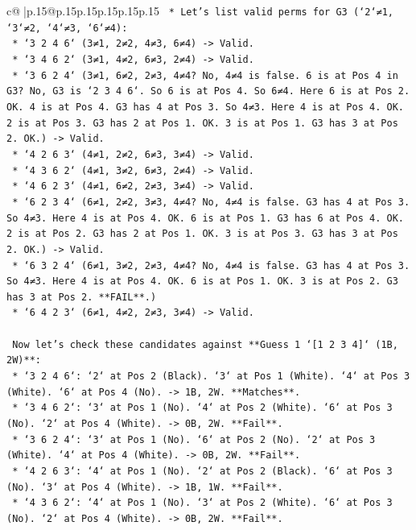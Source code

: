 \documentclass{article}
\begin{document}
{\begin{supertabular}{c@{$\;$}|p{.15\linewidth}@{}p{.15\linewidth}p{.15\linewidth}p{.15\linewidth}p{.15\linewidth}p{.15\linewidth}}
{{{\texttt{        *   Let's list valid perms for G3 (`2`≠1, `3`≠2, `4`≠3, `6`≠4):} \\
\texttt{            *   `3 2 4 6` (3≠1, 2≠2, 4≠3, 6≠4) {-}> Valid.} \\
\texttt{            *   `3 4 6 2` (3≠1, 4≠2, 6≠3, 2≠4) {-}> Valid.} \\
\texttt{            *   `3 6 2 4` (3≠1, 6≠2, 2≠3, 4≠4? No, 4≠4 is false. 6 is at Pos 4 in G3? No, G3 is `2 3 4 6`. So 6 is at Pos 4. So 6≠4. Here 6 is at Pos 2. OK. 4 is at Pos 4. G3 has 4 at Pos 3. So 4≠3. Here 4 is at Pos 4. OK. 2 is at Pos 3. G3 has 2 at Pos 1. OK. 3 is at Pos 1. G3 has 3 at Pos 2. OK.) {-}> Valid.} \\
\texttt{            *   `4 2 6 3` (4≠1, 2≠2, 6≠3, 3≠4) {-}> Valid.} \\
\texttt{            *   `4 3 6 2` (4≠1, 3≠2, 6≠3, 2≠4) {-}> Valid.} \\
\texttt{            *   `4 6 2 3` (4≠1, 6≠2, 2≠3, 3≠4) {-}> Valid.} \\
\texttt{            *   `6 2 3 4` (6≠1, 2≠2, 3≠3, 4≠4? No, 4≠4 is false. G3 has 4 at Pos 3. So 4≠3. Here 4 is at Pos 4. OK. 6 is at Pos 1. G3 has 6 at Pos 4. OK. 2 is at Pos 2. G3 has 2 at Pos 1. OK. 3 is at Pos 3. G3 has 3 at Pos 2. OK.) {-}> Valid.} \\
\texttt{            *   `6 3 2 4` (6≠1, 3≠2, 2≠3, 4≠4? No, 4≠4 is false. G3 has 4 at Pos 3. So 4≠3. Here 4 is at Pos 4. OK. 6 is at Pos 1. OK. 3 is at Pos 2. G3 has 3 at Pos 2. **FAIL**.)} \\
\texttt{            *   `6 4 2 3` (6≠1, 4≠2, 2≠3, 3≠4) {-}> Valid.} \\
\\ 
\texttt{    Now let's check these candidates against **Guess 1 `{[}1 2 3 4{]}` (1B, 2W)**:} \\
\texttt{    *   `3 2 4 6`: `2` at Pos 2 (Black). `3` at Pos 1 (White). `4` at Pos 3 (White). `6` at Pos 4 (No). {-}> 1B, 2W. **Matches**.} \\
\texttt{    *   `3 4 6 2`: `3` at Pos 1 (No). `4` at Pos 2 (White). `6` at Pos 3 (No). `2` at Pos 4 (White). {-}> 0B, 2W. **Fail**.} \\
\texttt{    *   `3 6 2 4`: `3` at Pos 1 (No). `6` at Pos 2 (No). `2` at Pos 3 (White). `4` at Pos 4 (White). {-}> 0B, 2W. **Fail**.} \\
\texttt{    *   `4 2 6 3`: `4` at Pos 1 (No). `2` at Pos 2 (Black). `6` at Pos 3 (No). `3` at Pos 4 (White). {-}> 1B, 1W. **Fail**.} \\
\texttt{    *   `4 3 6 2`: `4` at Pos 1 (No). `3` at Pos 2 (White). `6` at Pos 3 (No). `2` at Pos 4 (White). {-}> 0B, 2W. **Fail**.} \\
}}}
\end{supertabular}}
\end{document}

